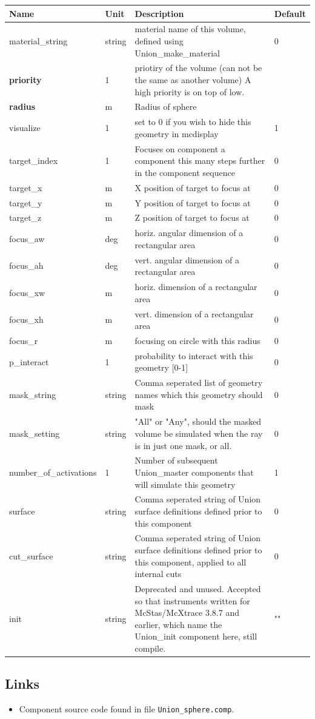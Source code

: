 \begin{longtable}{p{}p{}p{}p{}}
\toprule
\textbf{Name} & \textbf{Unit} & \textbf{Description} & \textbf{Default} \\
\midrule
\endhead
material\_string & string & material name of this volume, defined using Union\_make\_material & 0 \\
\textbf{priority} & 1 & priotiry of the volume (can not be the same as another volume) A high priority is on top of low. &  \\
\textbf{radius} & m & Radius of sphere &  \\
visualize & 1 & set to 0 if you wish to hide this geometry in mcdisplay & 1 \\
target\_index & 1 & Focuses on component a component this many steps further in the component sequence & 0 \\
target\_x & m & X position of target to focus at & 0 \\
target\_y & m & Y position of target to focus at & 0 \\
target\_z & m & Z position of target to focus at & 0 \\
focus\_aw & deg & horiz. angular dimension of a rectangular area & 0 \\
focus\_ah & deg & vert. angular dimension of a rectangular area & 0 \\
focus\_xw & m & horiz. dimension of a rectangular area & 0 \\
focus\_xh & m & vert. dimension of a rectangular area & 0 \\
focus\_r & m & focusing on circle with this radius & 0 \\
p\_interact & 1 & probability to interact with this geometry [0-1] & 0 \\
mask\_string & string & Comma seperated list of geometry names which this geometry should mask & 0 \\
mask\_setting & string & "All" or "Any", should the masked volume be simulated when the ray is in just one mask, or all. & 0 \\
number\_of\_activations & 1 & Number of subsequent Union\_master components that will simulate this geometry & 1 \\
surface & string & Comma seperated string of Union surface definitions defined prior to this component & 0 \\
cut\_surface & string & Comma seperated string of Union surface definitions defined prior to this component, applied to all internal cuts & 0 \\
init & string & Deprecated and unused. Accepted so that instruments written for McStas/McXtrace 3.8.7 and earlier, which name the Union\_init component here, still compile. & "" \\
\bottomrule
\end{longtable}

\subsection*{Links}
\begin{itemize}
  \item Component source code found in file \texttt{Union\_sphere.comp}.
\end{itemize}
